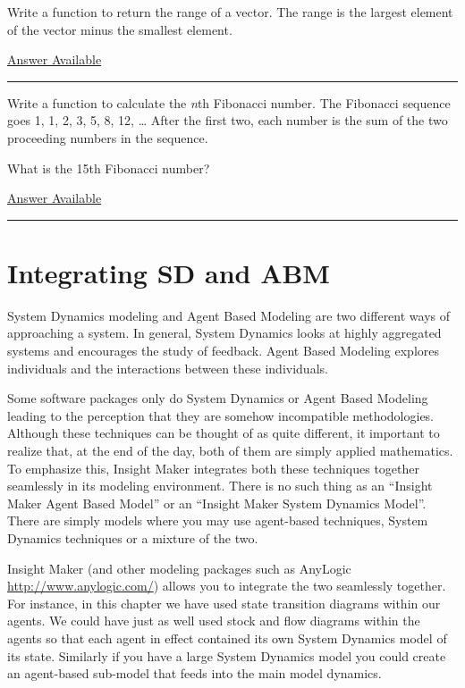 \documentclass[]{memoir}
\begin{document}
Write a function to return the range of a vector. The range is the
largest element of the vector minus the smallest element.

\hyperref[Ans-13-12]{Answer Available}

\begin{center}\rule{3in}{0.4pt}\end{center}


Write a function to calculate the \emph{n}th Fibonacci number. The
Fibonacci sequence goes 1, 1, 2, 3, 5, 8, 12, \ldots{} After the first
two, each number is the sum of the two proceeding numbers in the
sequence.

What is the 15th Fibonacci number?

\hyperref[Ans-13-13]{Answer Available}

\begin{center}\rule{3in}{0.4pt}\end{center}

\section{Integrating SD and ABM}

System Dynamics modeling and Agent Based Modeling are two different ways
of approaching a system. In general, System Dynamics looks at highly
aggregated systems and encourages the study of feedback. Agent Based
Modeling explores individuals and the interactions between these
individuals.

Some software packages only do System Dynamics or Agent Based Modeling
leading to the perception that they are somehow incompatible
methodologies. Although these techniques can be thought of as quite
different, it important to realize that, at the end of the day, both of
them are simply applied mathematics. To emphasize this, Insight Maker
integrates both these techniques together seamlessly in its modeling
environment. There is no such thing as an ``Insight Maker Agent Based
Model'' or an ``Insight Maker System Dynamics Model''. There are simply
models where you may use agent-based techniques, System Dynamics
techniques or a mixture of the two.

Insight Maker (and other modeling packages such as AnyLogic
\url{http://www.anylogic.com/}) allows you to integrate the two
seamlessly together. For instance, in this chapter we have used state
transition diagrams within our agents. We could have just as well used
stock and flow diagrams within the agents so that each agent in effect
contained its own System Dynamics model of its state. Similarly if you
have a large System Dynamics model you could create an agent-based
sub-model that feeds into the main model dynamics.
\end{document}

